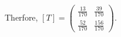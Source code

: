 \documentclass[12pt]{article}
\newenvironment{problem}[2][Problem]
{
	\begin{trivlist} 
		\item[\hskip \labelsep {\bfseries #1 #2:}]
	}
{
	\end{trivlist}
	}
\newenvironment{solution}[1][Solution]
{
	\begin{trivlist} 
		\item[\hskip \labelsep {\itshape #1:}]
	}
	{
	\end{trivlist}
}
\begin{document}
\begin{problem}{1}
\begin{solution}
\begin{align*}
\end{align*}
Therfore, $[T]= \begin{pmatrix} \frac{13}{170} & \frac{39}{170} \\ \frac{52}{170} & \frac{156}{170} \end{pmatrix}$. 
\end{solution}
\end{problem}
\end{document}
